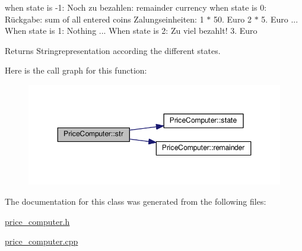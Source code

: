 when state is -\/1\-: Noch zu bezahlen\-: remainder currency when state is 0\-: Rückgabe\-: sum of all entered coins Zalungseinheiten\-: 1 $\ast$ 50. Euro 2 $\ast$ 5. Euro ... When state is 1\-: Nothing ... When state is 2\-: Zu viel bezahlt! 3. Euro

\begin{DoxyReturn}{Returns}
Stringrepresentation according the different states. 
\end{DoxyReturn}


Here is the call graph for this function\-:\nopagebreak
\begin{figure}[H]
\begin{center}
\leavevmode
\includegraphics[width=348pt]{classPriceComputer_ac6a85d7316a174de19a4eccdffd91ae3_cgraph}
\end{center}
\end{figure}




The documentation for this class was generated from the following files\-:\begin{DoxyCompactItemize}
\item 
\hyperlink{price__computer_8h}{price\-\_\-computer.\-h}\item 
\hyperlink{price__computer_8cpp}{price\-\_\-computer.\-cpp}\end{DoxyCompactItemize}
